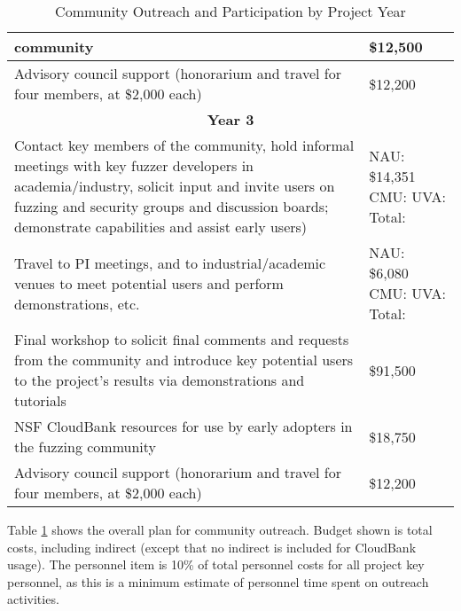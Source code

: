 \documentclass[12pt]{article}
\begin{document}
\begin{table}
\begin{tabular}{|p{12cm}|p{3cm}|}
    community & \$12,500 \\
    \hline 
    Advisory council support (honorarium and travel for four members, 
    at \$2,000 each) & \$12,200 \\    
    \hline
    \hline
    \multicolumn{2}{c}{{\bf Year 3}} \\
    \hline
    \hline
   Contact key members of the community, hold informal meetings with
    key fuzzer developers in academia/industry, solicit input and
    invite users
    on fuzzing and security groups and discussion boards; demonstrate
    capabilities and assist early users) &  NAU:  \$14,351 CMU: UVA:
                                                      Total:  \\
    \hline
    Travel to PI meetings, and to industrial/academic venues to meet
    potential users and perform demonstrations, etc. & NAU: \$6,080 CMU: UVA: Total:\\
    \hline    
    Final workshop to solicit final comments and requests from the
    community and introduce key potential users to the project’s
    results via demonstrations and tutorials & \$91,500 \\
    \hline
    NSF CloudBank resources for use by early adopters in the fuzzing 
    community & \$18,750 \\
    \hline 
    Advisory council support (honorarium and travel for four members, 
    at \$2,000 each) & \$12,200 \\    
    \hline    
 
  \end{tabular}
  \caption{Community Outreach and Participation by Project Year}
  \label{tab:outreach}
  
\end{table}


Table \ref{tab:outreach} shows the overall plan for community
outreach.   Budget shown is total costs, including indirect (except
that no indirect is included for CloudBank usage).  The personnel item is 10\%
of total personnel costs for all project key personnel, as this is a
minimum estimate of personnel time spent on outreach activities.
\end{document}
